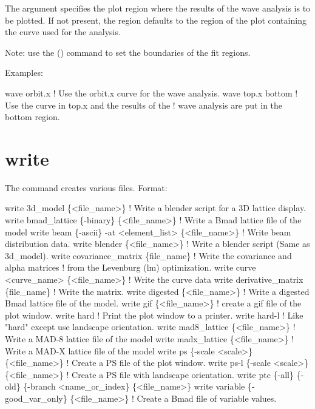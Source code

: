 {{{{{{{{{The  argument
specifies the plot region where the results of the wave analysis is to be plotted. If not
present, the region defaults to the region of the plot containing the curve used for the
analysis.

Note: use the  () command to set the boundaries of the fit regions.

Examples:
\begin{example}
  wave orbit.x      ! Use the orbit.x curve for the wave analysis.
  wave top.x bottom ! Use the curve in top.x and the results of the 
                    !  wave analysis are put in the bottom region.
\end{example}


\section{write}
\label{s:write}

The  command creates various files.
Format:
\begin{example}
  write 3d_model \{<file_name>\}           ! Write a blender script for a 3D lattice display.
  write bmad_lattice \{-binary\} \{<file_name>\} 
                                         ! Write a Bmad lattice file of the model
  write beam \{-ascii\} -at <element_list> \{<file_name>\} 
                                         ! Write beam distribution data.
  write blender \{<file_name>\}            ! Write a blender script (Same as 3d_model).
  write covariance_matrix \{file_name\}    ! Write the covariance and alpha matrices 
                                         !   from the Levenburg (lm) optimization.
  write curve <curve_name> \{<file_name>\} ! Write the curve data
  write derivative_matrix \{file_name\}    ! Write the  matrix.
  write digested \{<file_name>\}      ! Write a digested Bmad lattice file of the model.
  write gif \{<file_name>\}           ! create a gif file of the plot window.
  write hard                        ! Print the plot window to a printer.
  write hard-l                      ! Like "hard" except use landscape orientation. 
  write mad8_lattice \{<file_name>\}  ! Write a MAD-8 lattice file of the model
  write madx_lattice \{<file_name>\}  ! Write a MAD-X lattice file of the model
  write ps \{-scale <scale>\} \{<file_name>\}      
                                    ! Create a PS file of the plot window.
  write ps-l \{-scale <scale>\} \{<file_name>\}    
                                    ! Create a PS file with landscape orientation.
  write ptc \{-all\} \{-old\} \{-branch <name_or_index\} \{<file_name>\}
  write variable \{-good_var_only\} \{<file_name>\} 
                                    ! Create a Bmad file of variable values.
\end{example}

}}}}}}}}}
